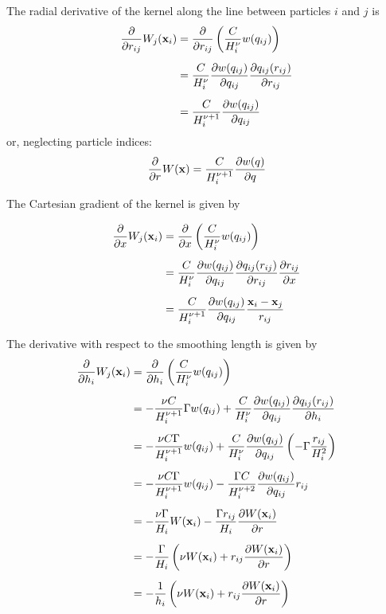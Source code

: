 The radial derivative of the kernel along the line between particles $i$ and $j$ is
%
\begin{align}
	\frac{\partial}{\partial r_{ij}} W_j (\mathbf{x}_i) 	
			&= \frac{\partial}{\partial r_{ij}} \left( \frac{C}{H_i^\nu} w ( q_{ij} )	\right)	\nonumber \\[.5em]
			&= \frac{C}{H_i^\nu} \frac{\partial w(q_{ij})}{\partial q_{ij}} \frac{\partial q_{ij}(r_{ij})}{\partial r_{ij}} 	\nonumber \\[.5em]
			&= \frac{C}{H_i^{\nu + 1}} \frac{\partial w(q_{ij})}{\partial q_{ij}}  \label{eq:kernel-dWdr-with-indices}
\end{align}
or, neglecting particle indices:
\begin{align}
	\frac{\partial}{\partial r} W (\mathbf{x}) = \frac{C}{H_i^{\nu + 1}} \frac{\partial w(q)}{\partial q} \label{eq:kernel-dWdr}
\end{align}




The Cartesian gradient of the kernel is given by

\begin{align}
	\frac{\partial}{\partial x} W_j (\mathbf{x}_i) 	
			&= \frac{\partial}{\partial x} \left( \frac{C}{H_i^\nu} w ( q_{ij} )	\right)	\nonumber \\[.5em]
			&= \frac{C}{H_i^\nu} \frac{\partial w(q_{ij})}{\partial q_{ij}} \frac{\partial q_{ij}(r_{ij})}{\partial r_{ij}} \frac{\partial r_{ij}}{\partial x} \nonumber \\[.5em]
			&= \frac{C}{H_i^{\nu + 1}} \frac{\partial w(q_{ij})}{\partial q_{ij}}  \frac{\mathbf{x}_i - \mathbf{x}_j}{r_{ij}} 	\label{grad_kernel_final}
\end{align}



The derivative with respect to the smoothing length is given by
\begin{align}
	\frac{\partial}{\partial h_{i}} W_j (\mathbf{x}_i) 	
			&= \frac{\partial}{\partial h_{i}} \left( \frac{C}{H_i^\nu} w ( q_{ij} )	\right)	\nonumber \\[.5em]
			&= -\frac{\nu C }{H_i^{\nu + 1}} \Gamma w(q_{ij})
				+ \frac{C}{H_i^\nu} \frac{\partial w(q_{ij})}{\partial q_{ij}} \frac{\partial q_{ij}(r_{ij})}{\partial h_{i}} 	\nonumber\\[.5em]
			&= -\frac{\nu C \Gamma}{H_i^{\nu + 1}} w(q_{ij})
				+\frac{C}{H_i^\nu} \frac{\partial w(q_{ij})}{\partial q_{ij}} \left( - \Gamma \frac{r_{ij}}{H_i^2} \right) 	\nonumber\\[.5em]
			&= -\frac{\nu C \Gamma}{H_i^{\nu + 1}} w(q_{ij})
				-\frac{\Gamma C}{H_i^{\nu + 2}} \frac{\partial w(q_{ij})}{\partial q_{ij}} r_{ij} 	\nonumber\\[.5em]
			&= - \frac{\nu \Gamma}{H_i} W(\mathbf{x}_i) - \frac{\Gamma r_{ij}}{H_i} \frac{\partial W(\mathbf{x}_i)}{\partial r} \nonumber \\[.5em]
			&= - \frac{\Gamma}{H_i} \left( \nu W(\mathbf{x}_i) + r_{ij}  \frac{\partial W(\mathbf{x}_i)}{\partial r} \right) \nonumber \\[.5em]
			&= - \frac{1}{h_i} \left( \nu W(\mathbf{x}_i) + r_{ij}  \frac{\partial W(\mathbf{x}_i)}{\partial r} \right) 
			 \label{eq:kernel-dWdh}
\end{align}








